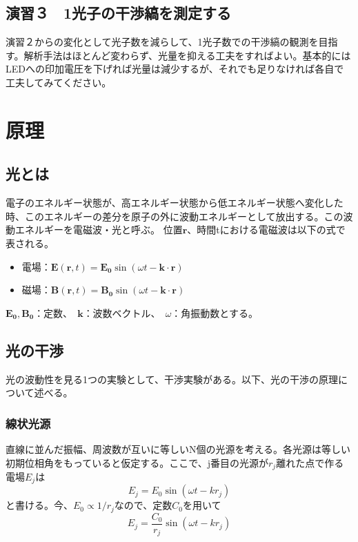 \documentclass[10pt]{ujarticle}
\begin{document}
\subsection{演習３　1光子の干渉縞を測定する}
演習２からの変化として光子数を減らして、1光子数での干渉縞の観測を目指す。解析手法はほとんど変わらず、光量を抑える工夫をすればよい。基本的にはLEDへの印加電圧を下げれば光量は減少するが、それでも足りなければ各自で工夫してみてください。

\clearpage
\section{原理}

\subsection{光とは}
電子のエネルギー状態が、高エネルギー状態から低エネルギー状態へ変化した時、このエネルギーの差分を原子の外に波動エネルギーとして放出する。この波動エネルギーを電磁波・光と呼ぶ。
位置$\bm{r}$、時間tにおける電磁波は以下の式で表される。
\begin{itemize}
\item 電場：$\bm{E} (\bm{r}, t) = \bm{E_0} \sin (\omega t - \bm{k} \cdot \bm{r} ) $
\item 磁場：$\bm{B} (\bm{r}, t) = \bm{B_0} \sin (\omega t - \bm{k} \cdot \bm{r} ) $
\end{itemize}
$\bm{E_0}, \bm{B_0}$：定数、　$\bm{k}$：波数ベクトル、　$\omega$：角振動数とする。

\subsection{光の干渉}
光の波動性を見る1つの実験として、干渉実験がある。以下、光の干渉の原理について述べる。
\subsubsection{線状光源}
直線に並んだ振幅、周波数が互いに等しいN個の光源を考える。各光源は等しい初期位相角をもっていると仮定する。ここで、j番目の光源が$r_j$離れた点で作る電場$E_j$は
\[
E_j = E_0 \sin(\omega t - k r_j)
\]
と書ける。今、$E_0 \varpropto 1/{r_j}$なので、定数$C_0$を用いて
\[
E_j = \frac{C_0}{r_j} \sin(\omega t - k r_j)
\]
\end{document}
